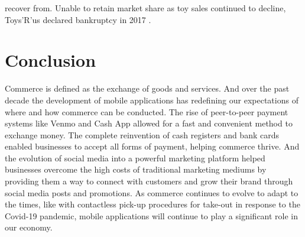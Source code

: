 \documentclass{article}
\begin{document}
recover from. Unable to retain market share as toy sales continued to decline, Toys’R’us declared bankruptcy in 2017 \cite{deoca_2020}. 

\section{Conclusion}
Commerce is defined as the exchange of goods and services. And over the past decade the development of mobile applications has redefining our expectations of where and how commerce can be conducted. The rise of peer-to-peer payment systems like Venmo and Cash App allowed for a fast and convenient method to exchange money. The complete reinvention of cash registers and bank cards enabled businesses to accept all forms of payment, helping commerce thrive. And the evolution of social media into a powerful marketing platform helped businesses overcome the high costs of traditional marketing mediums by providing them a way to connect with customers and grow their brand through social media posts and promotions.
As commerce continues to evolve to adapt to the times, like with contactless pick-up procedures for take-out in response to the Covid-19 pandemic, mobile applications will continue to play a significant role in our economy.



\end{document}
